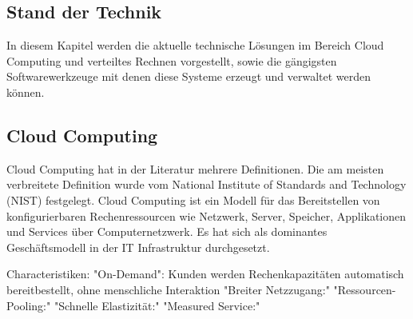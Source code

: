 \subsection*{Stand der Technik}

In diesem Kapitel werden die aktuelle technische Lösungen im Bereich Cloud Computing und verteiltes Rechnen
 vorgestellt, sowie die gängigsten Softwarewerkzeuge mit denen diese Systeme erzeugt und verwaltet werden können.

\subsection*{Cloud Computing}
Cloud Computing hat in der Literatur mehrere Definitionen. \cite{Marston2011} Die am meisten verbreitete Definition
wurde vom National Institute of Standards and Technology (NIST) festgelegt.
Cloud Computing ist ein Modell für das Bereitstellen von konfigurierbaren Rechenressourcen wie Netzwerk,
Server, Speicher, Applikationen und Services über Computernetzwerk. \cite{Mell2011} 
Es hat sich als dominantes Geschäftsmodell in der IT Infrastruktur durchgesetzt. \cite{Benlian2018}

Characteristiken:
    "On-Demand": Kunden werden Rechenkapazitäten automatisch bereitbestellt, ohne menschliche Interaktion
    "Breiter Netzzugang:" 
    "Ressourcen-Pooling:" 
    "Schnelle Elastizität:" 
    "Measured Service:" 
\clearpage